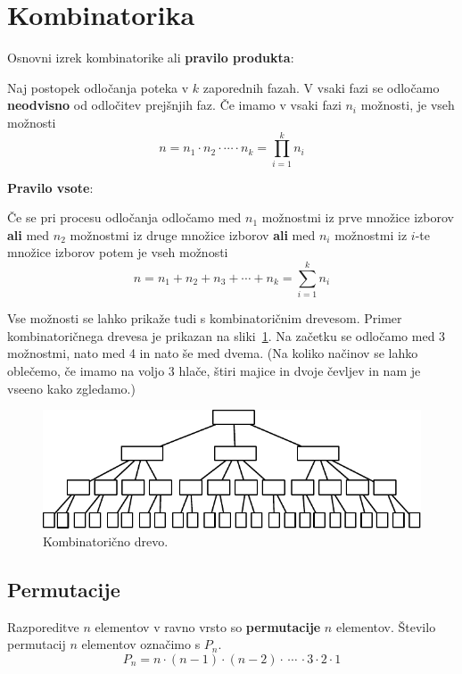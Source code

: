 \documentclass[a4paper,oneside,12pt,fleqn]{article}
\newcommand\krat\cdot
\newcommand{\beforecaptionskip}{\vspace{-12pt}}
\numberwithin{equation}{section}
\begin{document}
\section{Kombinatorika}
\label{sec:komb}

Osnovni izrek kombinatorike ali \textbf{pravilo produkta}:

Naj postopek odločanja poteka v $k$ zaporednih fazah. V vsaki fazi se odločamo
\textbf{neodvisno} od odločitev prejšnjih faz. Če imamo v vsaki fazi $n_i$ možnosti, je
vseh možnosti
\[ n = n_1 \krat n_2 \krat \cdots \krat n_k = \prod_{i=1}^kn_i \]

\textbf{Pravilo vsote}:

Če se pri procesu odločanja odločamo med $n_1$ možnostmi iz prve množice izborov
\textbf{ali} med $n_2$ možnostmi iz druge množice izborov \textbf{ali} med $n_i$ možnostmi
iz $i$-te množice izborov potem je vseh možnosti
\[ n = n_1 + n_2 + n_3 + \cdots + n_k = \sum_{i=1}^kn_i \]

Vse možnosti se lahko prikaže tudi s kombinatoričnim drevesom. Primer kombinatoričnega
drevesa je prikazan na sliki~\ref{fig:komb:drevo}. Na začetku se odločamo med 3 možnostmi,
nato med 4 in nato še med dvema. (Na koliko načinov se lahko oblečemo, če imamo na voljo 3
hlače, štiri majice in dvoje čevljev in nam je vseeno kako zgledamo.)

\begin{figure}[ht]
  \begin{center}
    \includegraphics[width=\textwidth]{slike/komb_drevo.pdf}
   \end{center}
  \beforecaptionskip
  \caption{Kombinatorično drevo.}
  \label{fig:komb:drevo}
\end{figure}

\subsection{Permutacije}
\label{sec:komb:perm}
Razporeditve $n$ elementov v ravno vrsto so \textbf{permutacije} $n$ elementov. Število permutacij
$n$ elementov označimo s $P_n$.
\[ P_n = n\krat(n-1)\krat(n-2)\krat \,\cdots\, \krat 3 \krat 2 \krat 1 \]
\end{document}
